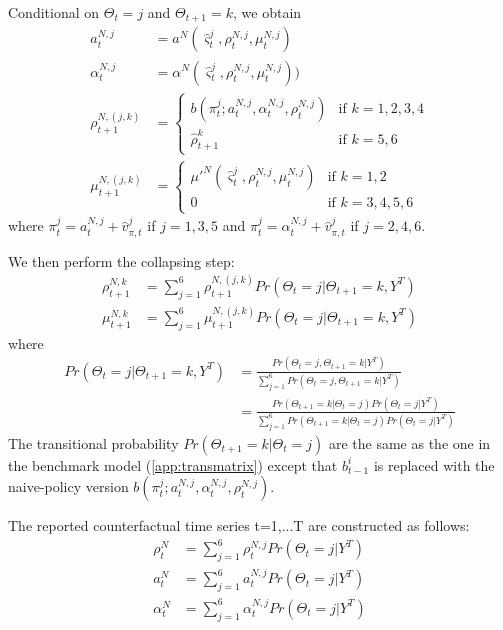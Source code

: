 \documentclass[12pt,letter,leqno]{article}
\theoremstyle{asn}
\theoremstyle{lem}
\theoremstyle{slem}
\theoremstyle{prop}
\theoremstyle{appprop}
\theoremstyle{rem}
\theoremstyle{defn}
\begin{document}
Conditional on $\Theta_t=j$ and $\Theta_{t+1}=k$, we obtain
\begin{align*}
 a^{N,j}_t&=a^{N}(\hat{\varsigma}^j_t,\rho^{N,j}_t,\mu^{N,j}_t) \\
\alpha^{N,j}_t&=\alpha^{N}(\hat{\varsigma}^j_t,\rho^{N,j}_t,\mu^{N,j}_t)) \\
\rho^{N,(j,k)}_{t+1} &=\left\{ 
\begin{array}{cc}
b(\pi_t^{j};a^{N,j}_t,\alpha^{N,j}_t,\rho^{N,j}_t) & \text{if } k=1,2,3,4  \\ 
\hat{\rho}^k_{t+1} & \text{if } k=5,6%
\end{array}%
\right.   \\
\mu^{N,(j,k)}_{t+1} &=\left\{ 
\begin{array}{cc}
\mu'^{N}(\hat{\varsigma}^j_t,\rho^{N,j}_t,\mu^{N,j}_t) & \text{if } k=1,2  \\ 
0 & \text{if } k=3,4,5,6%
\end{array}%
\right.   
\end{align*}
where $\pi_t^{j}=a^{N,j}_t+\hat{v}_{\pi,t}^j$ if $j=1, 3, 5$ and $\pi_t^{j}=\alpha^{N,j}_t+\hat{v}_{\pi,t}^j$ if $j=2,4,6$. 

We then perform the collapsing step:
\begin{align*}
\rho^{N,k}_{t+1} &= \sum_{j=1}^6 \rho^{N,(j,k)}_{t+1} Pr(\Theta_t=j|\Theta_{t+1}=k,Y^T) \\
\mu^{N,k}_{t+1} &= \sum_{j=1}^6 \mu^{N,(j,k)}_{t+1} Pr(\Theta_t=j|\Theta_{t+1}=k,Y^T)
\end{align*}
where
\begin{align*}
Pr(\Theta_t=j|\Theta_{t+1}=k,Y^T) &= \frac{Pr(\Theta_t=j,\Theta_{t+1}=k|Y^T)}{\sum_{j=1}^6 Pr(\Theta_t=j,\Theta_{t+1}=k|Y^T) } \\
&=\frac{Pr(\Theta_{t+1}=k|\Theta_t=j)Pr(\Theta_t=j|Y^T)}{\sum_{j=1}^6 Pr(\Theta_{t+1}=k|\Theta_t=j)Pr(\Theta_t=j|Y^T) }
\end{align*}
The transitional probability $Pr(\Theta_{t+1}=k|\Theta_t=j)$ are the same as the one in the benchmark model (\ref{app:transmatrix}) except that $b_{t-1}^i$ is replaced with the naive-policy version $b(\pi_t^{j};a^{N,j}_t,\alpha^{N,j}_t,\rho^{N,j}_t)$.

The reported counterfactual time series t=1,...T are constructed as follows:
\begin{align*}
\rho^N_{t} &= \sum_{j=1}^6 \rho^{N,j}_{t}Pr(\Theta_{t}=j|Y^T) \\
a^N_{t} &= \sum_{j=1}^6 a^{N,j}_{t}Pr(\Theta_{t}=j|Y^T)\\
\alpha^N_{t} &= \sum_{j=1}^6 \alpha^{N,j}_{t}Pr(\Theta_{t}=j|Y^T)
\end{align*}
\end{document}
